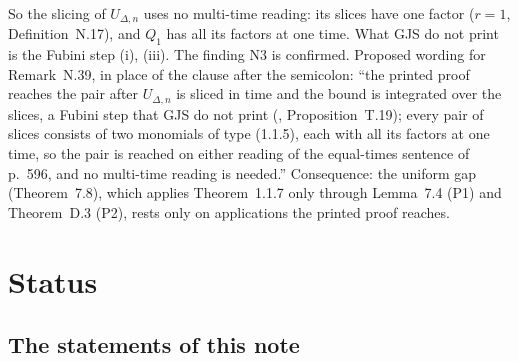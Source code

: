 \documentclass[11pt,a4paper]{article}
\theoremstyle{plain}
\theoremstyle{definition}
\begin{document}
So the slicing of $U_{\Delta,n}$ uses no multi-time reading: its slices have one factor
($r=1$, Definition~N.17), and $Q_1$ has all its factors at one time.  What GJS do not print is
the Fubini step (i), (iii).  The finding N3 is confirmed.  Proposed wording for Remark~N.39, in
place of the clause after the semicolon: ``the printed proof reaches the pair after
$U_{\Delta,n}$ is sliced in time and the bound is integrated over the slices, a Fubini step that
GJS do not print (, Proposition~T.19); every pair of slices consists of
two monomials of type (1.1.5), each with all its factors at one time, so the pair is reached on
either reading of the equal-times sentence of p.~596, and no multi-time reading is needed.''
Consequence: the uniform gap (Theorem~7.8), which applies Theorem~1.1.7 only through Lemma~7.4
(P1) and Theorem~D.3 (P2), rests only on applications the printed proof reaches.

\section{Status}\label{sec:status}

\subsection{The statements of this note}
\end{document}
